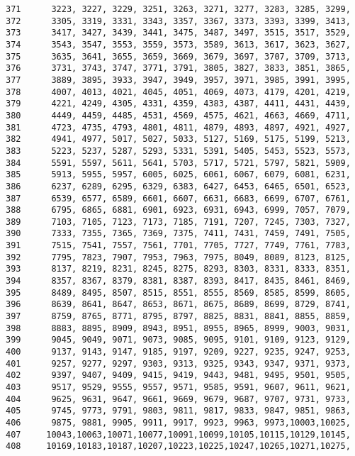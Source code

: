 \begin{Code}
\begin{verbatim}
371      3223, 3227, 3229, 3251, 3263, 3271, 3277, 3283, 3285, 3299,
372      3305, 3319, 3331, 3343, 3357, 3367, 3373, 3393, 3399, 3413,
373      3417, 3427, 3439, 3441, 3475, 3487, 3497, 3515, 3517, 3529,
374      3543, 3547, 3553, 3559, 3573, 3589, 3613, 3617, 3623, 3627,
375      3635, 3641, 3655, 3659, 3669, 3679, 3697, 3707, 3709, 3713,
376      3731, 3743, 3747, 3771, 3791, 3805, 3827, 3833, 3851, 3865,
377      3889, 3895, 3933, 3947, 3949, 3957, 3971, 3985, 3991, 3995,
378      4007, 4013, 4021, 4045, 4051, 4069, 4073, 4179, 4201, 4219,
379      4221, 4249, 4305, 4331, 4359, 4383, 4387, 4411, 4431, 4439,
380      4449, 4459, 4485, 4531, 4569, 4575, 4621, 4663, 4669, 4711,
381      4723, 4735, 4793, 4801, 4811, 4879, 4893, 4897, 4921, 4927,
382      4941, 4977, 5017, 5027, 5033, 5127, 5169, 5175, 5199, 5213,
383      5223, 5237, 5287, 5293, 5331, 5391, 5405, 5453, 5523, 5573,
384      5591, 5597, 5611, 5641, 5703, 5717, 5721, 5797, 5821, 5909,
385      5913, 5955, 5957, 6005, 6025, 6061, 6067, 6079, 6081, 6231,
386      6237, 6289, 6295, 6329, 6383, 6427, 6453, 6465, 6501, 6523,
387      6539, 6577, 6589, 6601, 6607, 6631, 6683, 6699, 6707, 6761,
388      6795, 6865, 6881, 6901, 6923, 6931, 6943, 6999, 7057, 7079,
389      7103, 7105, 7123, 7173, 7185, 7191, 7207, 7245, 7303, 7327, 
390      7333, 7355, 7365, 7369, 7375, 7411, 7431, 7459, 7491, 7505, 
391      7515, 7541, 7557, 7561, 7701, 7705, 7727, 7749, 7761, 7783,
392      7795, 7823, 7907, 7953, 7963, 7975, 8049, 8089, 8123, 8125,
393      8137, 8219, 8231, 8245, 8275, 8293, 8303, 8331, 8333, 8351,
394      8357, 8367, 8379, 8381, 8387, 8393, 8417, 8435, 8461, 8469,
395      8489, 8495, 8507, 8515, 8551, 8555, 8569, 8585, 8599, 8605,
396      8639, 8641, 8647, 8653, 8671, 8675, 8689, 8699, 8729, 8741,
397      8759, 8765, 8771, 8795, 8797, 8825, 8831, 8841, 8855, 8859,
398      8883, 8895, 8909, 8943, 8951, 8955, 8965, 8999, 9003, 9031,
399      9045, 9049, 9071, 9073, 9085, 9095, 9101, 9109, 9123, 9129,
400      9137, 9143, 9147, 9185, 9197, 9209, 9227, 9235, 9247, 9253,
401      9257, 9277, 9297, 9303, 9313, 9325, 9343, 9347, 9371, 9373,
402      9397, 9407, 9409, 9415, 9419, 9443, 9481, 9495, 9501, 9505,
403      9517, 9529, 9555, 9557, 9571, 9585, 9591, 9607, 9611, 9621,
404      9625, 9631, 9647, 9661, 9669, 9679, 9687, 9707, 9731, 9733,
405      9745, 9773, 9791, 9803, 9811, 9817, 9833, 9847, 9851, 9863,
406      9875, 9881, 9905, 9911, 9917, 9923, 9963, 9973,10003,10025,
407     10043,10063,10071,10077,10091,10099,10105,10115,10129,10145,
408     10169,10183,10187,10207,10223,10225,10247,10265,10271,10275,

\end{verbatim}
\end{Code}
